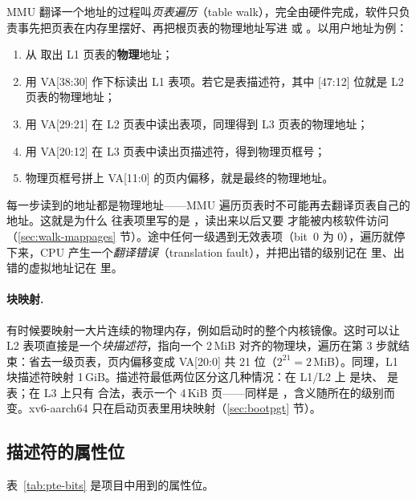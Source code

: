MMU 翻译一个地址的过程叫\emph{页表遍历}（table walk），完全由硬件完成，软件只负责事先把页表在内存里摆好、再把根页表的物理地址写进  或 。以用户地址为例：

\begin{enumerate}
  \item 从  取出 L1 页表的\textbf{物理}地址；
  \item 用 VA[38:30] 作下标读出 L1 表项。若它是表描述符，其中 [47:12] 位就是 L2 页表的物理地址；
  \item 用 VA[29:21] 在 L2 页表中读出表项，同理得到 L3 页表的物理地址；
  \item 用 VA[20:12] 在 L3 页表中读出页描述符，得到物理页框号；
  \item 物理页框号拼上 VA[11:0] 的页内偏移，就是最终的物理地址。
\end{enumerate}

每一步读到的地址都是物理地址——MMU 遍历页表时不可能再去翻译页表自己的地址。这就是为什么  往表项里写的是 ，读出来以后又要  才能被内核软件访问（\ref{sec:walk-mappages} 节）。途中任何一级遇到无效表项（bit~0 为 0），遍历就停下来，CPU 产生一个\emph{翻译错误}（translation fault），并把出错的级别记在  里、出错的虚拟地址记在  里。

\paragraph{块映射.} 有时候要映射一大片连续的物理内存，例如启动时的整个内核镜像。这时可以让 L2 表项直接是一个\emph{块描述符}，指向一个 2\,MiB 对齐的物理块，遍历在第 3 步就结束：省去一级页表，页内偏移变成 VA[20:0] 共 21 位（$2^{21}=2$\,MiB）。同理，L1 块描述符映射 1\,GiB。描述符最低两位区分这几种情况：在 L1/L2 上  是块、 是表；在 L3 上只有  合法，表示一个 4\,KiB 页——同样是 ，含义随所在的级别而变。xv6-aarch64 只在启动页表里用块映射（\ref{sec:bootpgt} 节）。

\subsection{描述符的属性位}

表~\ref{tab:pte-bits} 是项目中用到的属性位。

